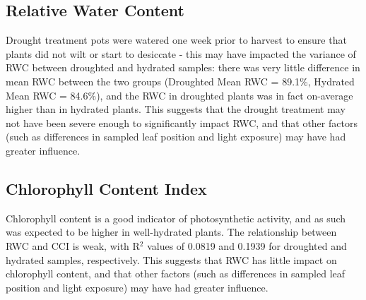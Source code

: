 \documentclass{report}
\begin{document}

\subsection*{Relative Water Content}

\hspace{24pt}Drought treatment pots were watered one week prior to harvest to ensure that plants did not wilt or start to desiccate - this may have impacted the variance of RWC between droughted and hydrated samples: there was very little difference in mean RWC between the two groups (Droughted Mean RWC = 89.1\%, Hydrated Mean RWC = 84.6\%), and the RWC in droughted plants was in fact on-average higher than in hydrated plants. This suggests that the drought treatment may not have been severe enough to significantly impact RWC, and that other factors (such as differences in sampled leaf position and light exposure) may have had greater influence.

\subsection*{Chlorophyll Content Index}

\hspace{24pt}Chlorophyll content is a good indicator of photosynthetic activity, and as such was expected to be higher in well-hydrated plants. The relationship between RWC and CCI is weak, with R${}^{2}$ values of 0.0819 and 0.1939 for droughted and hydrated samples, respectively. This suggests that RWC has little impact on chlorophyll content, and that other factors (such as differences in sampled leaf position and light exposure) may have had greater influence.
\end{document}
